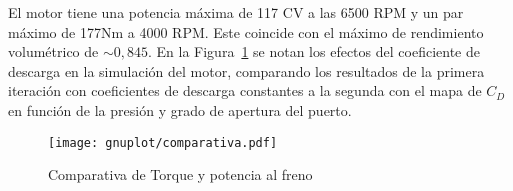 El motor tiene una potencia máxima de 117 CV a las 6500 RPM y un par máximo de
177Nm a 4000 RPM.
%
Este coincide con el máximo de rendimiento volumétrico de $\sim 0,845$.
%
En la Figura~\ref{fig:PoTi_segunda_op} se notan los efectos del coeficiente de
descarga en la simulación del motor, comparando los resultados de la primera
iteración con coeficientes de descarga constantes a la segunda con el mapa de
$C_{D}$ en función de la presión y grado de apertura del puerto.

\begin{figure}[ht]
  \centering
  \texttt{[image: gnuplot/comparativa.pdf]}
  \caption{Comparativa de Torque y potencia al freno} \label{fig:PoTi_segunda_op}
\end{figure}
